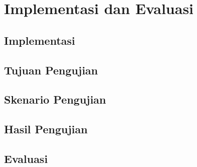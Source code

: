\chapter{Implementasi dan Evaluasi}

\section{Implementasi}
\blindtext

\section{Tujuan Pengujian}
\blindtext

\section{Skenario Pengujian}
\blindtext

\section{Hasil Pengujian}
\blindtext

\section{Evaluasi}
\blindtext

